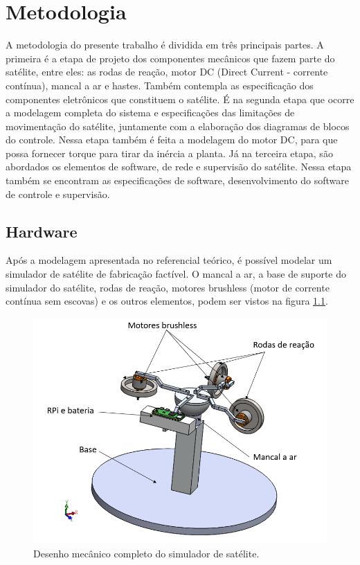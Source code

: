 \chapter{Metodologia}

A metodologia do presente trabalho é dividida em três principais partes. A primeira é a etapa de projeto dos componentes mecânicos que fazem parte do satélite, entre eles: as rodas de reação, motor DC (Direct Current - corrente contínua), mancal a ar e hastes. Também contempla as especificação dos componentes eletrônicos que constituem o satélite. É na segunda etapa que ocorre a modelagem completa do sistema e especificações das limitações de movimentação do satélite, juntamente com a elaboração dos diagramas de blocos do controle. Nessa etapa também é feita a modelagem do motor DC, para que possa fornecer torque para tirar da inércia a planta. Já na terceira etapa, são abordados os elementos de software, de rede e supervisão do satélite. Nessa etapa também se encontram as especificações de software, desenvolvimento do software de controle e supervisão.



\section{Hardware}

Após a modelagem apresentada no referencial teórico, é possível modelar um simulador de satélite de fabricação factível.  O mancal a ar, a base de suporte do simulador do satélite, rodas de reação, motores brushless (motor de corrente contínua sem escovas) e os outros elementos, podem ser vistos na figura \ref{fig:satelite_completo}.

\begin{figure}[H]
  \caption{Desenho mecânico completo do simulador de satélite.}
  \begin{center}
      \includegraphics[scale=.5]{metodologia/img/satelite_completo}
  \end{center}
  \label{fig:satelite_completo}
\end{figure}

